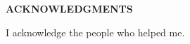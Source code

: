 \providecommand\phantomsection{} \phantomsection
\thispagestyle{plain}
\renewcommand{\baselinestretch}{1}\small\normalsize
\begin{center}
\vspace*{0.375in}
\textbf{ACKNOWLEDGMENTS}\\[3\baselineskip]
\end{center}
\renewcommand{\baselinestretch}{1.66} \small\normalsize%
I acknowledge the people who helped me.
\newpage